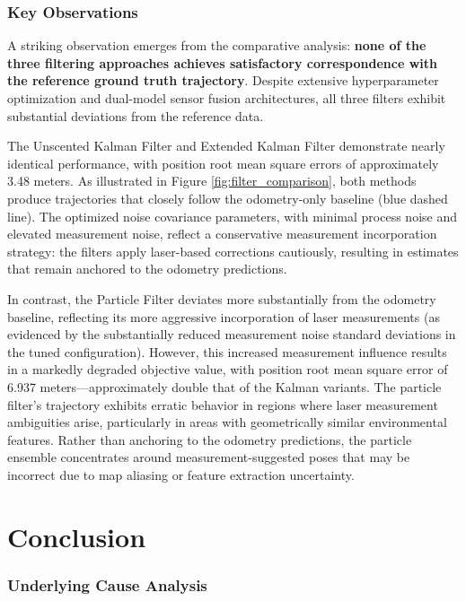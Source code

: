 \documentclass[conference]{IEEEtran}
\begin{document}
\subsubsection{Key Observations}

A striking observation emerges from the comparative analysis: \textbf{none of the three filtering approaches achieves satisfactory correspondence with the reference ground truth trajectory}. Despite extensive hyperparameter optimization and dual-model sensor fusion architectures, all three filters exhibit substantial deviations from the reference data.

The Unscented Kalman Filter and Extended Kalman Filter demonstrate nearly identical performance, with position root mean square errors of approximately 3.48 meters. As illustrated in Figure \ref{fig:filter_comparison}, both methods produce trajectories that closely follow the odometry-only baseline (blue dashed line). The optimized noise covariance parameters, with minimal process noise and elevated measurement noise, reflect a conservative measurement incorporation strategy: the filters apply laser-based corrections cautiously, resulting in estimates that remain anchored to the odometry predictions.

In contrast, the Particle Filter deviates more substantially from the odometry baseline, reflecting its more aggressive incorporation of laser measurements (as evidenced by the substantially reduced measurement noise standard deviations in the tuned configuration). However, this increased measurement influence results in a markedly degraded objective value, with position root mean square error of 6.937 meters—approximately double that of the Kalman variants. The particle filter's trajectory exhibits erratic behavior in regions where laser measurement ambiguities arise, particularly in areas with geometrically similar environmental features. Rather than anchoring to the odometry predictions, the particle ensemble concentrates around measurement-suggested poses that may be incorrect due to map aliasing or feature extraction uncertainty.

\section{Conclusion} \label{sec:conclusion}

\subsubsection{Underlying Cause Analysis}
\end{document}
